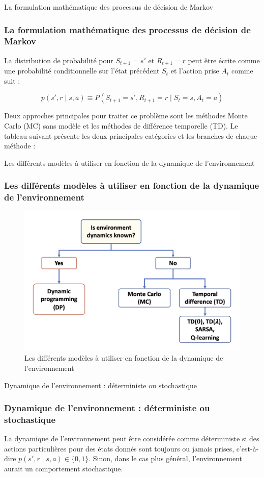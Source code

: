 \documentclass[serif, aspectratio=169]{beamer}
\begin{document}
\begin{frame}{La formulation mathématique des processus de décision de Markov}
	\frametitle{La formulation mathématique des processus de décision de Markov}
	
	La distribution de probabilité pour \( S_{t+1} = s' \) et \( R_{t+1} = r \) peut être écrite comme une probabilité conditionnelle sur l'état précédent \( S_t \) et l'action prise \( A_t \) comme suit :
	
	\[
	p(s', r \mid s, a) \equiv P(S_{t+1} = s', R_{t+1} = r \mid S_t = s, A_t = a)
	\]
	
	\vspace{20pt}
	
	Deux approches principales pour traiter ce problème sont les méthodes Monte Carlo (MC) sans modèle et les méthodes de différence temporelle (TD). Le tableau suivant présente les deux principales catégories et les branches de chaque méthode :
	
\end{frame}

\begin{frame}{Les différents modèles à utiliser en fonction de la dynamique de l'environnement}
	\frametitle{Les différents modèles à utiliser en fonction de la dynamique de l'environnement}
	
	\begin{figure}[htpb]
		\centering
		\includegraphics[keepaspectratio, scale=0.7]{images/markov.png}
		\caption{Les différents modèles à utiliser en fonction de la dynamique de l'environnement}
	\end{figure}
	
\end{frame}


\begin{frame}{Dynamique de l'environnement : déterministe ou stochastique}
	\frametitle{Dynamique de l'environnement : déterministe ou stochastique}
		
		La dynamique de l'environnement peut être considérée comme déterministe si des actions particulières pour des états donnés sont toujours ou jamais prises, c'est-à-dire \(p(s', r \mid s, a) \in \{0,1\}\). Sinon, dans le cas plus général, l'environnement aurait un comportement stochastique.
		
\end{frame}
\end{document}
